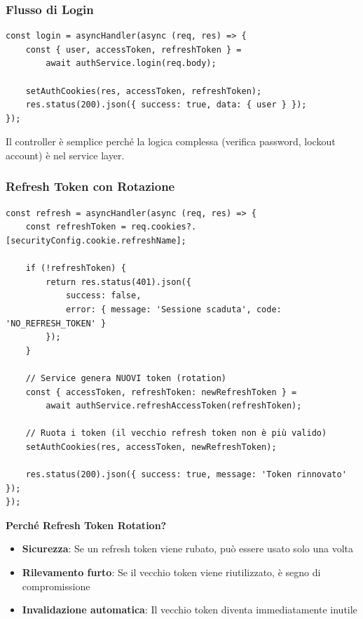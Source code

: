 \documentclass[11pt,a4paper]{article}
\begin{document}
\subsubsection{Flusso di Login}

\begin{lstlisting}[caption=Login con Protezione Brute Force]
const login = asyncHandler(async (req, res) => {
    const { user, accessToken, refreshToken } = 
        await authService.login(req.body);
    
    setAuthCookies(res, accessToken, refreshToken);
    res.status(200).json({ success: true, data: { user } });
});
\end{lstlisting}

Il controller è semplice perché la logica complessa (verifica password, lockout account) è nel service layer.

\subsubsection{Refresh Token con Rotazione}

\begin{lstlisting}[caption=Refresh Token con Rotazione]
const refresh = asyncHandler(async (req, res) => {
    const refreshToken = req.cookies?.[securityConfig.cookie.refreshName];

    if (!refreshToken) {
        return res.status(401).json({
            success: false,
            error: { message: 'Sessione scaduta', code: 'NO_REFRESH_TOKEN' }
        });
    }

    // Service genera NUOVI token (rotation)
    const { accessToken, refreshToken: newRefreshToken } = 
        await authService.refreshAccessToken(refreshToken);

    // Ruota i token (il vecchio refresh token non è più valido)
    setAuthCookies(res, accessToken, newRefreshToken);

    res.status(200).json({ success: true, message: 'Token rinnovato' });
});
\end{lstlisting}

\textbf{Perché Refresh Token Rotation?}
\begin{itemize}
    \item \textbf{Sicurezza}: Se un refresh token viene rubato, può essere usato solo una volta
    \item \textbf{Rilevamento furto}: Se il vecchio token viene riutilizzato, è segno di compromissione
    \item \textbf{Invalidazione automatica}: Il vecchio token diventa immediatamente inutile
\end{itemize}
\end{document}
